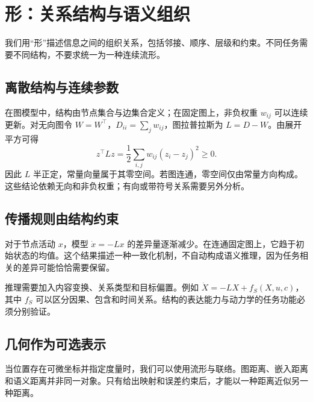 \chapter{形：关系结构与语义组织}
\label{chp:morphos_skeleton}
\label{sec:morphos_definition}
\label{sec:s_elements}
\label{sec:base_manifold}
\label{sec:cup_example}

我们用“形”描述信息之间的组织关系，包括邻接、顺序、层级和约束。不同任务需要不同结构，不要求统一为一种连续流形。
\section{离散结构与连续参数}
在图模型中，结构由节点集合与边集合定义；在固定图上，非负权重 $w_{ij}$ 可以连续更新。对无向图令 $W=W^\top$，$D_{ii}=\sum_jw_{ij}$，图拉普拉斯为 $L=D-W$。由展开平方可得
\begin{equation}z^\top Lz=\frac12\sum_{i,j}w_{ij}(z_i-z_j)^2\ge0.\end{equation}
因此 $L$ 半正定，常量向量属于其零空间。若图连通，零空间仅由常量方向构成。这些结论依赖无向和非负权重；有向或带符号关系需要另外分析。
\section{传播规则由结构约束}
对于节点活动 $x$，模型 $\dot x=-Lx$ 的差异量逐渐减少。在连通固定图上，它趋于初始状态的均值。这个结果描述一种一致化机制，不自动构成语义推理，因为任务相关的差异可能恰恰需要保留。

推理需要加入内容变换、关系类型和目标偏置。例如 $\dot X=-LX+f_S(X,u,c)$，其中 $f_S$ 可以区分因果、包含和时间关系。结构的表达能力与动力学的任务功能必须分别验证。
\section{几何作为可选表示}
当位置存在可微坐标并指定度量时，我们可以使用流形与联络。图距离、嵌入距离和语义距离并非同一对象。只有给出映射和误差约束后，才能以一种距离近似另一种距离。
